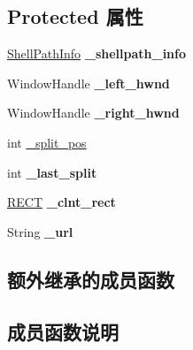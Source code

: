 \subsection*{Protected 属性}
\begin{DoxyCompactItemize}
\item 
\mbox{\label{struct_s_d_i_main_frame_a885ddbd08d8d3666611122fd0f567387}} 
\hyperlink{struct_shell_path_info}{Shell\+Path\+Info} {\bfseries \+\_\+shellpath\+\_\+info}
\item 
\mbox{\label{struct_s_d_i_main_frame_a55e07e4f618bf98c9fa4b8927538c950}} 
Window\+Handle {\bfseries \+\_\+left\+\_\+hwnd}
\item 
\mbox{\label{struct_s_d_i_main_frame_a4e3aca7d0fd0d681c1c3d229ab0ce2a8}} 
Window\+Handle {\bfseries \+\_\+right\+\_\+hwnd}
\item 
int \hyperlink{struct_s_d_i_main_frame_ab5627e9d93b8557c6ead9de6a98c845b}{\+\_\+split\+\_\+pos}
\item 
\mbox{\label{struct_s_d_i_main_frame_a354bf894768d9e73cc61435361ec32d8}} 
int {\bfseries \+\_\+last\+\_\+split}
\item 
\mbox{\label{struct_s_d_i_main_frame_aa65ae48bc26e1ed520e96b36ad6253bf}} 
\hyperlink{structtag_r_e_c_t}{R\+E\+CT} {\bfseries \+\_\+clnt\+\_\+rect}
\item 
\mbox{\label{struct_s_d_i_main_frame_a1e2b1f2398f3741493207bf193fa3c84}} 
String {\bfseries \+\_\+url}
\end{DoxyCompactItemize}
\subsection*{额外继承的成员函数}


\subsection{成员函数说明}
\mbox{\label{struct_s_d_i_main_frame_ad46e76e9bcc00352bba90e9eb5cdf5a2}} 
